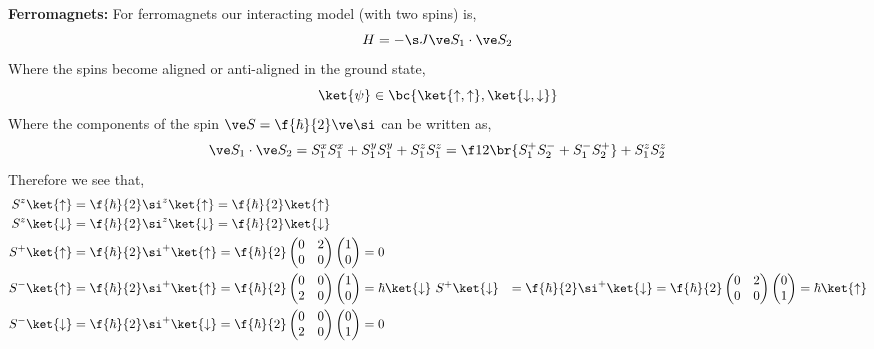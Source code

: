 \documentclass{article}
\newcommand{\uu}{\uparrow}
\newcommand{\dd}{\downarrow}
\begin{document}
\textbf{Ferromagnets:}
For ferromagnets our interacting model (with two spins) is,
\[ H = - \s J \ve S_1 \cdot \ve S_2 \]
Where the spins become aligned or anti-aligned in the ground state,
\[ \ket{\psi} \in \bc{\ket{\uu, \uu}, \ket{\dd, \dd}} \]
Where the components of the spin $\ve S = \f{\hbar}{2} \ve \si$ can be written as,
\[ \ve S_1 \cdot \ve S_2 = S_1^xS_1^x + S_1^yS_1^y + S_1^zS_1^z = \f12 \br{S_1^+ S_2^- + S_1^- S_2^+} + S_1^z S_2^z \]
Therefore we see that,
\begin{align*}
    S^z \ket{\uu} &= \f{\hbar}{2}\si^{z}\ket{\uu} = \f{\hbar}{2}\ket{\uu} \\
    S^z \ket{\dd} &= \f{\hbar}{2}\si^{z}\ket{\dd} = \f{\hbar}{2}\ket{\dd} \\
    S^+ \ket{\uu} &= \f{\hbar}{2}\si^{+}\ket{\uu} = \f{\hbar}{2} \begin{pmatrix}
        0 & 2 \\
        0 & 0 \\
    \end{pmatrix}\begin{pmatrix}
        1 \\ 0
    \end{pmatrix}  = 0 \\
    S^- \ket{\uu} &= \f{\hbar}{2}\si^{+}\ket{\uu} = \f{\hbar}{2} \begin{pmatrix}
        0 & 0 \\
        2 & 0 \\
    \end{pmatrix}\begin{pmatrix}
        1 \\ 0
    \end{pmatrix} = \hbar \ket{\dd} \
    S^+ \ket{\dd} &= \f{\hbar}{2}\si^{+}\ket{\dd} = \f{\hbar}{2} \begin{pmatrix}
        0 & 2 \\
        0 & 0 \\
    \end{pmatrix}\begin{pmatrix}
        0 \\ 1
    \end{pmatrix}  = \hbar \ket{\uu} \\
    S^- \ket{\dd} &= \f{\hbar}{2}\si^{+}\ket{\dd} = \f{\hbar}{2} \begin{pmatrix}
        0 & 0 \\
        2 & 0 \\
    \end{pmatrix}\begin{pmatrix}
        0 \\ 1
    \end{pmatrix} = 0
\end{align*}
\end{document}
